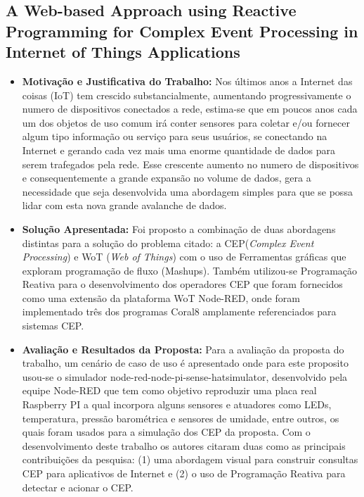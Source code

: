 \documentclass[tid,table]{texufpel} %
\begin{document}
\subsection{A Web-based Approach using Reactive Programming for Complex Event Processing in Internet of Things Applications}

\begin{itemize}
	\item \textbf{Motivação e Justificativa do Trabalho:} Nos últimos anos a Internet das coisas (IoT) tem crescido substancialmente, aumentando progressivamente o numero de dispositivos conectados a rede, estima-se que em poucos anos cada um dos objetos de uso comum irá conter sensores para coletar e/ou fornecer algum tipo informação ou serviço para seus usuários, se conectando na Internet e gerando cada vez mais uma enorme quantidade de dados para serem trafegados pela rede. Esse crescente aumento no numero de dispositivos e consequentemente a grande expansão no volume de dados, gera a necessidade que seja desenvolvida uma abordagem simples para que se possa lidar com esta nova grande avalanche de dados.
	
	\item \textbf{Solução Apresentada:} Foi proposto a combinação de duas abordagens distintas para a solução do problema citado: a CEP(\textit{Complex Event Processing}) e WoT (\textit{Web of Things}) com o uso de Ferramentas gráficas que exploram programação de fluxo (Mashups). Também utilizou-se Programação Reativa para o desenvolvimento dos operadores CEP que foram fornecidos como uma extensão da plataforma WoT Node-RED, onde foram implementado três dos programas Coral8 amplamente referenciados para sistemas CEP. 
	
	\item \textbf{Avaliação e Resultados da Proposta:} Para a avaliação da proposta do trabalho, um cenário de caso de uso é apresentado onde para este proposito usou-se o simulador node-red-node-pi-sense-hatsimulator, desenvolvido pela equipe Node-RED que tem como objetivo reproduzir uma placa real Raspberry PI a qual incorpora alguns sensores e atuadores como LEDs, temperatura, pressão barométrica e sensores de umidade, entre outros, os quais foram usados para a simulação dos CEP da proposta. Com o desenvolvimento deste trabalho os autores citaram duas como as principais contribuições da pesquisa: (1) uma abordagem visual para construir consultas CEP para aplicativos de Internet e (2) o uso de Programação Reativa para detectar e acionar o CEP.
	
\end{itemize}
\end{document}
